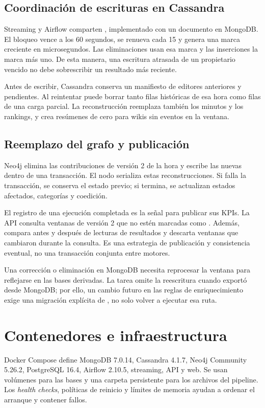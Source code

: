 \subsection{Coordinación de escrituras en Cassandra}
Streaming y Airflow comparten , implementado con un documento en MongoDB. El bloqueo vence a los 60 segundos, se renueva cada 15 y genera una marca creciente en microsegundos. Las eliminaciones usan esa marca y las inserciones la marca más uno. De esta manera, una escritura atrasada de un propietario vencido no debe sobrescribir un resultado más reciente.

Antes de escribir, Cassandra conserva un manifiesto de editores anteriores y pendientes. Al reintentar puede borrar tanto filas históricas de esa hora como filas de una carga parcial. La reconstrucción reemplaza también los minutos y los rankings, y crea resúmenes de cero para wikis sin eventos en la ventana.

\subsection{Reemplazo del grafo y publicación}
Neo4j elimina las contribuciones de versión 2 de la hora y escribe las nuevas dentro de una transacción. El nodo  serializa estas reconstrucciones. Si falla la transacción, se conserva el estado previo; si termina, se actualizan estados afectados, categorías y coedición.

El registro de una ejecución completada es la señal para publicar sus KPIs. La API consulta ventanas de versión 2 que no estén marcadas como . Además, compara  antes y después de lecturas de resultados y descarta ventanas que cambiaron durante la consulta. Es una estrategia de publicación y consistencia eventual, no una transacción conjunta entre motores.

Una corrección o eliminación en MongoDB necesita reprocesar la ventana para reflejarse en las bases derivadas. La tarea  omite la reescritura cuando exportó desde MongoDB; por ello, un cambio futuro en las reglas de enriquecimiento exige una migración explícita de , no solo volver a ejecutar esa ruta.

\section{Contenedores e infraestructura}
Docker Compose define MongoDB 7.0.14, Cassandra 4.1.7, Neo4j Community 5.26.2, PostgreSQL 16.4, Airflow 2.10.5, streaming, API y web. Se usan volúmenes para las bases y una carpeta persistente para los archivos del pipeline. Los \textit{health checks}, políticas de reinicio y límites de memoria ayudan a ordenar el arranque y contener fallos.


